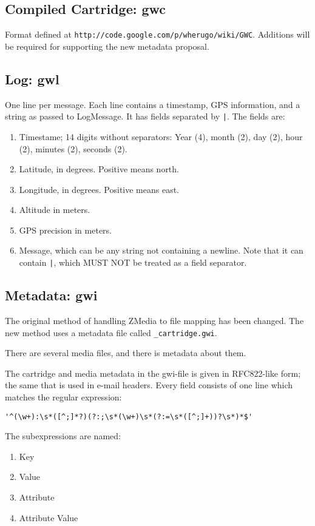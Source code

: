 \documentclass{article}
\begin{document}
\subsection{Compiled Cartridge: gwc}
Format defined at \verb-http://code.google.com/p/wherugo/wiki/GWC-. Additions will be required for supporting the new metadata proposal.

\subsection{Log: gwl}
One line per message. Each line contains a timestamp, GPS information, and a string as passed to LogMessage. It has fields separated by \verb-|-. The fields are:
\begin{enumerate}
	\item Timestame; 14 digits without separators: Year (4), month (2), day (2), hour (2), minutes (2), seconds (2).
	\item Latitude, in degrees. Positive means north.
	\item Longitude, in degrees. Positive means east.
	\item Altitude in meters.
	\item GPS precision in meters.
	\item Message, which can be any string not containing a newline. Note that it can contain \verb-|-, which MUST NOT be treated as a field separator.
\end{enumerate}

\subsection{Metadata: gwi}
The original method of handling ZMedia to file mapping has been changed. The
new method uses a metadata file called \verb-_cartridge.gwi-.

There are several media files, and there is metadata about them.

The cartridge and media metadata in the gwi-file is given in RFC822-like form;
the same that is used in e-mail headers. Every field consists of one line which
matches the regular expression:

\begin{center}\verb-'^(\w+):\s*([^;]*?)(?:;\s*(\w+)\s*(?:=\s*([^;]+))?\s*)*$'-\end{center}

The subexpressions are named:
\begin{enumerate}
	\item Key
	\item Value
	\item Attribute
	\item Attribute Value
\end{enumerate}
\end{document}
